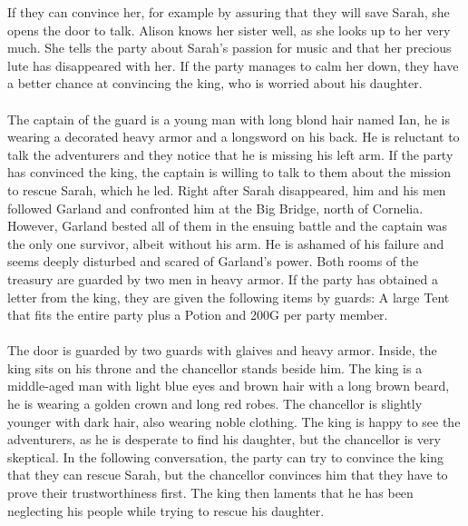 If they can convince her, for example by assuring that they will save Sarah, she opens the door to talk.
Alison knows her sister well, as she looks up to her very much.
She tells the party about Sarah's passion for music and that her precious lute has disappeared with her.
If the party manages to calm her down, they have a better chance at convincing the king, who is worried about his daughter.
%
\ofpar
%
\\\\
%
 The captain of the guard is a young man with long blond hair named Ian, he is wearing a decorated heavy armor and a longsword on his back.
He is reluctant to talk the adventurers and they notice that he is missing his left arm. 
If the party has convinced the king, the captain is willing to talk to them about the mission to rescue Sarah, which he led.
Right after Sarah disappeared, him and his men followed Garland and confronted him at the Big Bridge, north of Cornelia.
However, Garland bested all of them in the ensuing battle and the captain was the only one survivor, albeit without his arm.
He is ashamed of his failure and seems deeply disturbed and scared of Garland's power.
%
\ofpar
%
Both rooms of the treasury are guarded by two men in heavy armor.
If the party has obtained a letter from the king, they are given the following items by guards: 
A large Tent that fits the entire party plus a Potion and 200G per party member.
%
\ofpar
%
\\\\
%
 The door is guarded by two guards with glaives and heavy armor.
Inside, the king sits on his throne and the chancellor stands beside him.
The king is a middle-aged man with light blue eyes and brown hair with a long brown beard, he is wearing a golden crown and long red robes.
The chancellor is slightly younger with dark hair, also wearing noble clothing.
The king is happy to see the adventurers, as he is desperate to find his daughter, but the chancellor is very skeptical.
In the following conversation, the party can try to convince the king that they can rescue Sarah, but the chancellor convinces him that they have to prove their trustworthiness first.
The king then laments that he has been neglecting his people while trying to rescue his daughter.
